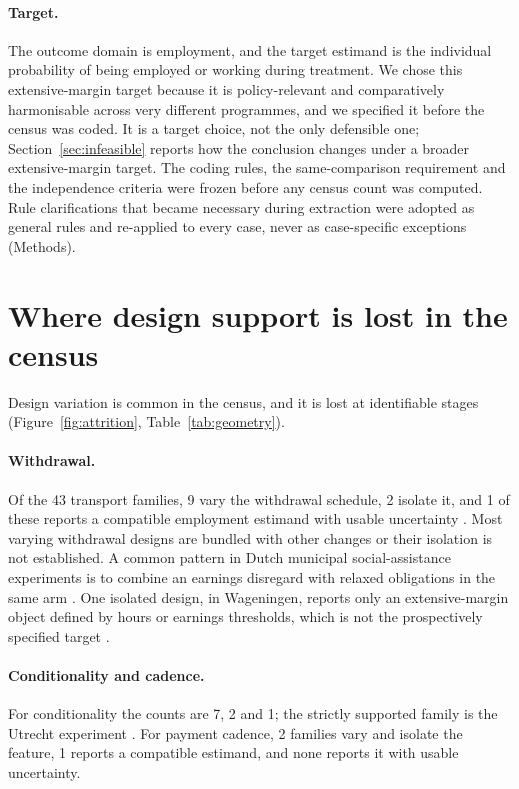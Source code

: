 \documentclass[11pt]{article}
\begin{document}
\paragraph{Target.} The outcome domain is employment, and the target estimand is the individual probability of being employed or working during treatment. We chose this extensive-margin target because it is policy-relevant and comparatively harmonisable across very different programmes, and we specified it before the census was coded. It is a target choice, not the only defensible one; Section~\ref{sec:infeasible} reports how the conclusion changes under a broader extensive-margin target. The coding rules, the same-comparison requirement and the independence criteria were frozen before any census count was computed. Rule clarifications that became necessary during extraction were adopted as general rules and re-applied to every case, never as case-specific exceptions (Methods).



\section{Where design support is lost in the census}

Design variation is common in the census, and it is lost at identifiable stages (Figure~\ref{fig:attrition}, Table~\ref{tab:geometry}).

\paragraph{Withdrawal.} Of the 43 transport families, 9 vary the withdrawal schedule, 2 isolate it, and 1 of these reports a compatible employment estimand with usable uncertainty \citep{verlaat2025}. %
Most varying withdrawal designs are bundled with other changes or their isolation is not established. A common pattern in Dutch municipal social-assistance experiments is to combine an earnings disregard with relaxed obligations in the same arm \citep{verlaat2022cpb}. One isolated design, in Wageningen, reports only an extensive-margin object defined by hours or earnings thresholds, which is not the prospectively specified target \citep{muffels2020}.

\paragraph{Conditionality and cadence.} For conditionality the counts are 7, 2 and 1; the strictly supported family is the Utrecht experiment \citep{verlaat2026}. %
For payment cadence, 2 families vary and isolate the feature, 1 reports a compatible estimand, and none reports it with usable uncertainty. %
\end{document}

